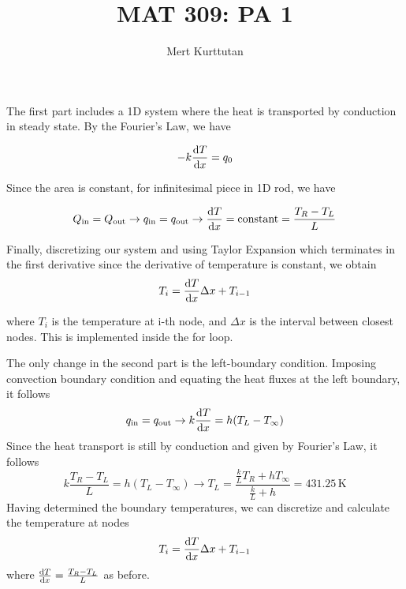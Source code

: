 \documentclass[11pt,a4paper]{article}
\title{MAT 309: PA 1}
\author{Mert Kurttutan}
\date{\vspace{-5ex}}
\numberwithin{equation}{section}
\newcommand{\subtit}[1]{\textbf{\noindent{\large #1}}}
\begin{document}
\maketitle
\subtit{Question A}

\subtit{a)} The first part includes a 1D system where the heat is transported by conduction in steady state. By the Fourier's Law, we have

\begin{equation}
-k \dv{T}{x} = q_0
\end{equation}

Since the area is constant, for infinitesimal piece in 1D rod, we have

\begin{equation}
Q_{\text{in}} = Q_{\text{out}} \to q_{\text{in}} = q_{\text{out}} \to \dv{T}{x} = \text{constant} = \frac{T_R-T_L}{L}
\end{equation}

Finally, discretizing our system and using Taylor Expansion which terminates in the first derivative since the derivative of temperature is constant, we obtain
\begin{equation}
T_i = \dv{T}{x}\Delta x + T_{i-1}
\end{equation}

where $T_i$ is the temperature at i-th node, and $\Delta x$ is the interval between closest nodes. This is implemented inside the for loop.

\subtit{b)}The only change in the second part is the left-boundary condition. Imposing convection boundary condition and equating the heat fluxes at the left boundary, it follows
\begin{equation}
q_{\text{in}} = q_{\text{out}} \to k\dv{T}{x} = h(T_L-T_{\infty})
\end{equation}
Since the heat transport is still by conduction and given by Fourier's Law, it follows
\begin{equation}
k\frac{T_R-T_L}{L} = h(T_L-T_{\infty}) \to T_L = \frac{\frac{k}{L}T_R  + h T_{\infty}}{\frac{k}{L} + h } = 431.25\, \text{K}
\end{equation}
Having determined the boundary temperatures, we can discretize and calculate the temperature at nodes
\begin{equation}
T_i = \dv{T}{x}\Delta x + T_{i-1}
\end{equation}
where $\dv{T}{x} = \frac{T_R-T_L}{L}$ as before. 
\end{document}
